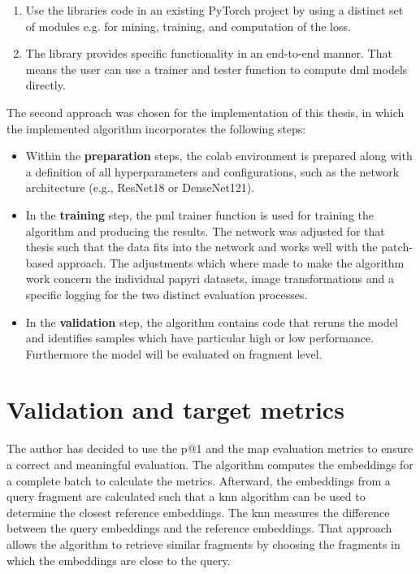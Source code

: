 \begin{enumerate}
	\item Use the libraries code in an existing PyTorch project by using a distinct set of modules e.g. for mining, training, and computation of the loss. 
	\item The library provides specific functionality in an end-to-end manner. That means the user can use a trainer and tester function to compute \ac{dml} models directly\cite{Musgrave20}.
\end{enumerate}
The second approach was chosen for the implementation of this thesis, in which the implemented algorithm incorporates the following steps:
\begin{itemize}
	\item Within the \textbf{preparation} steps, the \ac{colab} environment is prepared along with a definition of all hyperparameters and configurations, such as the network architecture (e.g., ResNet18 or DenseNet121). 
	\item In the \textbf{training} step, the \ac{pml} trainer function is used for training the algorithm and producing the results. The network was adjusted for that thesis such that the data fits into the network and works well with the patch-based approach. The adjustments which where made to make the algorithm work concern the individual papyri datasets, image transformations and a specific logging for the two distinct evaluation processes.
	\item In the \textbf{validation} step, the algorithm contains code that reruns the model and identifies samples which have particular high or low performance. Furthermore the model will be evaluated on fragment level.
\end{itemize}
%
\section{Validation and target metrics}
\label{sec:metrics}
The author has decided to use the \ac{p@1} and the \ac{map} evaluation metrics to ensure a correct and meaningful evaluation. The algorithm computes the embeddings for a complete batch to calculate the metrics. Afterward, the embeddings from a query fragment are calculated such that a \ac{knn} algorithm can be used to determine the closest reference embeddings. The \ac{knn} measures the difference between the query embeddings and the reference embeddings. That approach allows the algorithm to retrieve similar fragments by choosing the fragments in which the embeddings are close to the query.\\
%
